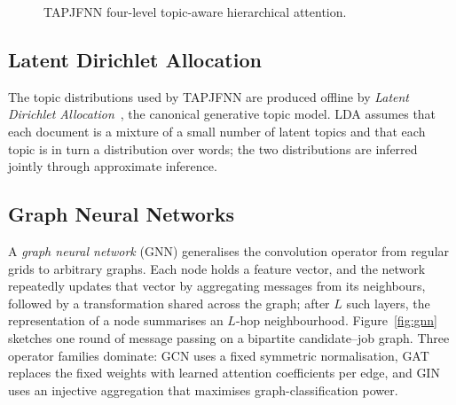 \begin{figure}[H]
    \caption{TAPJFNN four-level topic-aware hierarchical attention.}
    \label{fig:tapjfnn}
\end{figure}

\subsection{Latent Dirichlet Allocation}
The topic distributions used by TAPJFNN are produced offline by
\emph{Latent Dirichlet Allocation}~\cite{blei2003lda}, the canonical
generative topic model. LDA assumes that each document is a mixture of
a small number of latent topics and that each topic is in turn a
distribution over words; the two distributions are inferred jointly
through approximate inference.

\subsection{Graph Neural Networks}
A \emph{graph neural network} (GNN) generalises the convolution
operator from regular grids to arbitrary graphs. Each node holds a
feature vector, and the network repeatedly updates that vector by
aggregating messages from its neighbours, followed by a transformation
shared across the graph; after $L$ such layers, the representation of
a node summarises an $L$-hop neighbourhood. Figure~\ref{fig:gnn}
sketches one round of message passing on a bipartite candidate--job
graph. Three operator families dominate: \acs{GCN} uses a fixed symmetric
normalisation, \acs{GAT} replaces the fixed weights with learned
attention coefficients per edge, and \acs{GIN} uses an injective
aggregation that maximises graph-classification power.

